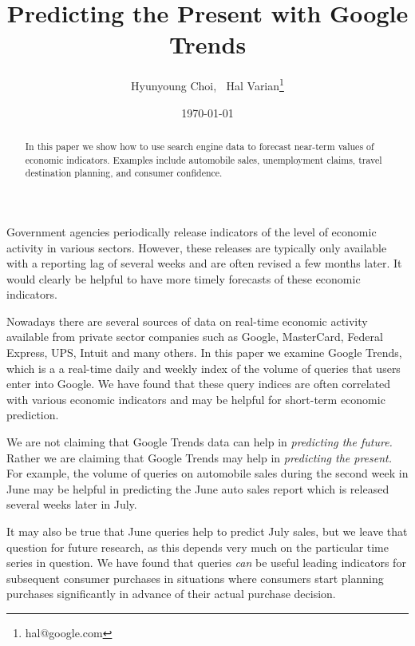 \documentclass[12pt, oneside]{article}
\begin{document}
\title{Predicting the Present with Google Trends}
\author{Hyunyoung Choi, $~$ Hal Varian\footnote{hal@google.com}} 
\date{\today}

\maketitle
\begin{abstract}\noindent In this paper we show how to use search
  engine data to forecast near-term values of economic indicators. Examples
  include automobile sales, unemployment claims, travel destination
  planning, and consumer confidence.
\end{abstract}

\noindent Government agencies periodically release indicators of the
level of economic activity in various sectors.  However, these
releases are typically only available with a reporting lag of several
weeks and are often revised a few months later.  It would clearly be
helpful to have more timely forecasts of these economic indicators.


Nowadays there are several sources of data on real-time economic
activity available from private sector companies such as Google,
MasterCard, Federal Express, UPS, Intuit and many others.  In this
paper we examine Google Trends, which is a a real-time daily and
weekly index of the volume of queries that users enter into Google.
We have found that these query indices are often correlated with
various economic indicators and may be helpful for short-term economic
prediction.

We are not claiming that Google Trends data can help in {\it
  predicting the future.\/} Rather we are claiming that Google Trends
may help in {\it predicting the present.}  For example, the volume of
queries on automobile sales during the second week in June may be
helpful in predicting the June auto sales report which is 
released several weeks later in July.

It may also be true that June queries help to predict July sales, but
we leave that question for future research, as this depends very much
on the particular time series in question.  We have found that queries
{\it can\/} be useful leading indicators for subsequent consumer
purchases in situations where consumers start planning purchases
significantly in advance of their actual purchase decision.
\end{document}
